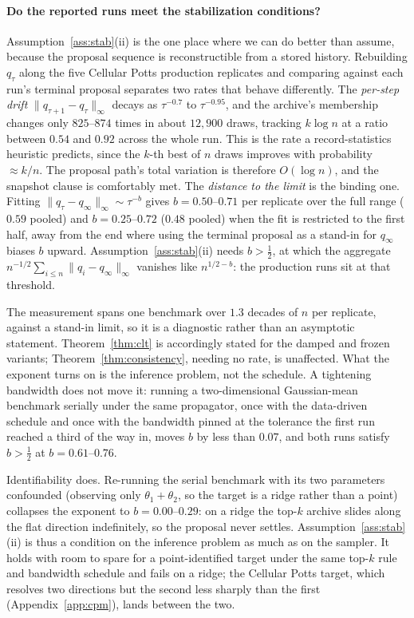 \documentclass[10pt]{article}
\theoremstyle{plain}
\theoremstyle{definition}
\begin{document}
\paragraph{Do the reported runs meet the stabilization conditions?} Assumption~\ref{ass:stab}(ii) is the one place where we can do better than assume, because the proposal sequence is reconstructible from a stored history. Rebuilding $q_\tau$ along the five Cellular Potts production replicates and comparing against each run's terminal proposal separates two rates that behave differently. The \emph{per-step drift} $\|q_{\tau+1}-q_\tau\|_\infty$ decays as $\tau^{-0.7}$ to $\tau^{-0.95}$, and the archive's membership changes only $825$--$874$ times in about $12{,}900$ draws, tracking $k\log n$ at a ratio between $0.54$ and $0.92$ across the whole run. This is the rate a record-statistics heuristic predicts, since the $k$-th best of $n$ draws improves with probability ${\approx}k/n$. The proposal path's total variation is therefore $O(\log n)$, and the snapshot clause is comfortably met. The \emph{distance to the limit} is the binding one. Fitting $\|q_\tau-q_\infty\|_\infty\sim\tau^{-b}$ gives $b=0.50$--$0.71$ per replicate over the full range ($0.59$ pooled) and $b=0.25$--$0.72$ ($0.48$ pooled) when the fit is restricted to the first half, away from the end where using the terminal proposal as a stand-in for $q_\infty$ biases $b$ upward. Assumption~\ref{ass:stab}(ii) needs $b>\tfrac12$, at which the aggregate $n^{-1/2}\sum_{i\le n}\|q_i-q_\infty\|_\infty$ vanishes like $n^{1/2-b}$: the production runs sit at that threshold.

The measurement spans one benchmark over $1.3$ decades of $n$ per replicate, against a stand-in limit, so it is a diagnostic rather than an asymptotic statement. Theorem~\ref{thm:clt} is accordingly stated for the damped and frozen variants; Theorem~\ref{thm:consistency}, needing no rate, is unaffected. What the exponent turns on is the inference problem, not the schedule. A tightening bandwidth does not move it: running a two-dimensional Gaussian-mean benchmark serially under the same propagator, once with the data-driven schedule and once with the bandwidth pinned at the tolerance the first run reached a third of the way in, moves $b$ by less than $0.07$, and both runs satisfy $b>\tfrac12$ at $b=0.61$--$0.76$.

Identifiability does. Re-running the serial benchmark with its two parameters confounded (observing only $\theta_1+\theta_2$, so the target is a ridge rather than a point) collapses the exponent to $b=0.00$--$0.29$: on a ridge the top-$k$ archive slides along the flat direction indefinitely, so the proposal never settles. Assumption~\ref{ass:stab}(ii) is thus a condition on the inference problem as much as on the sampler. It holds with room to spare for a point-identified target under the same top-$k$ rule and bandwidth schedule and fails on a ridge; the Cellular Potts target, which resolves two directions but the second less sharply than the first (Appendix~\ref{app:cpm}), lands between the two.
\end{document}
